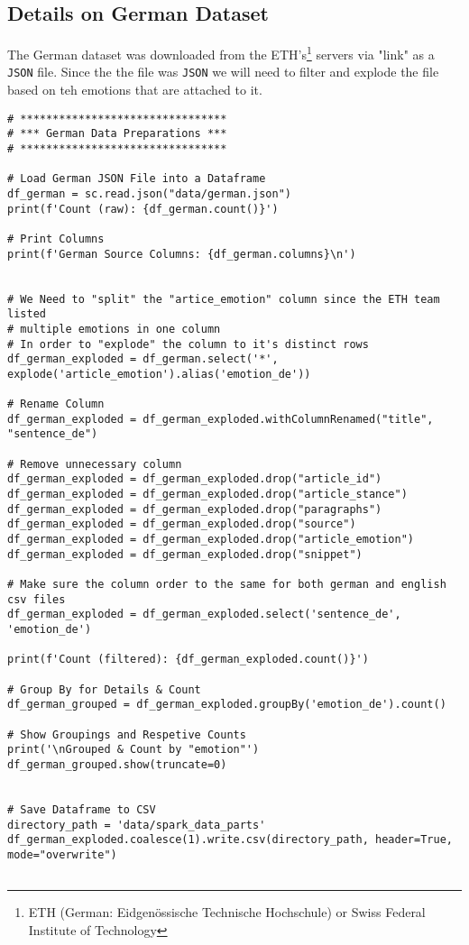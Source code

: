 \subsection{Details on German Dataset}
\label{appendix:dataset_german}
The German dataset was downloaded from the ETH's\footnote{ETH (German: Eidgenössische Technische Hochschule) or Swiss Federal Institute of Technology} servers via "link" as a \texttt{JSON} file. Since the the file was \texttt{JSON} we will need to filter and explode the file based on teh emotions that are attached to it.
\begin{verbatim}
# ********************************
# *** German Data Preparations ***
# ********************************

# Load German JSON File into a Dataframe
df_german = sc.read.json("data/german.json")
print(f'Count (raw): {df_german.count()}')

# Print Columns
print(f'German Source Columns: {df_german.columns}\n')


# We Need to "split" the "artice_emotion" column since the ETH team listed
# multiple emotions in one column
# In order to "explode" the column to it's distinct rows
df_german_exploded = df_german.select('*', explode('article_emotion').alias('emotion_de'))

# Rename Column
df_german_exploded = df_german_exploded.withColumnRenamed("title", "sentence_de")

# Remove unnecessary column
df_german_exploded = df_german_exploded.drop("article_id")
df_german_exploded = df_german_exploded.drop("article_stance")
df_german_exploded = df_german_exploded.drop("paragraphs")
df_german_exploded = df_german_exploded.drop("source")
df_german_exploded = df_german_exploded.drop("article_emotion")
df_german_exploded = df_german_exploded.drop("snippet")

# Make sure the column order to the same for both german and english csv files
df_german_exploded = df_german_exploded.select('sentence_de', 'emotion_de')

print(f'Count (filtered): {df_german_exploded.count()}')

# Group By for Details & Count
df_german_grouped = df_german_exploded.groupBy('emotion_de').count()

# Show Groupings and Respetive Counts
print('\nGrouped & Count by "emotion"')
df_german_grouped.show(truncate=0)


# Save Dataframe to CSV
directory_path = 'data/spark_data_parts'
df_german_exploded.coalesce(1).write.csv(directory_path, header=True, mode="overwrite")


\end{verbatim}
